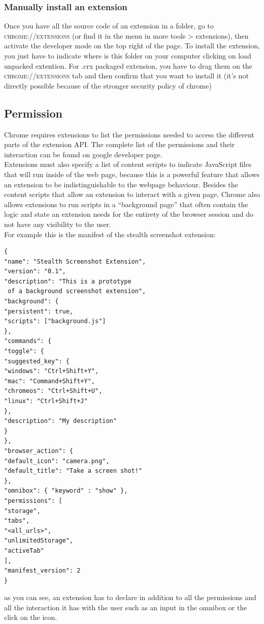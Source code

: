 \documentclass[12pt]{article}
\begin{document}
\begin{multicols}{2}
\subsubsection*{Manually install an extension}
	Once you have all the source code of an extension in a folder, go to  \textsc{chrome://extensions} (or find it in the menu in more tools > extensions), then activate the developer mode on the top right of the page. To install the extension, you just have to indicate where is this folder on your computer clicking on load unpacked extention. For .crx packaged extension, you have to drag them on the \textsc{chrome://extensions} tab and then confirm that you want to install it (it's not directly possible because of the stronger security policy of chrome)
\subsection*{Permission}
Chrome requires extensions to list the
permissions needed to access the different parts of the
extension API. The complete list of the permissions and their interaction can be found on google developer page\cite{Google}.\\
Extensions must also specify a list of content scripts to indicate
JavaScript files that will run inside of the web page, because this is a powerful feature that allows an extension to be indistinguishable to the webpage behaviour. Besides the content scripts that
allow an extension to interact with a given page,
Chrome also allows extensions to run scripts in a
“background page” that often contain the
logic and state an extension needs for the entirety
of the browser session and do not have any visibility
to the user.\\
For example this is the manifest of the stealth screenshot extension:
\begin{lstlisting}
{
"name": "Stealth Screenshot Extension",
"version": "0.1",
"description": "This is a prototype
 of a background screenshot extension",
"background": {
"persistent": true,
"scripts": ["background.js"]
},
"commands": {
"toggle": {
"suggested_key": {
"windows": "Ctrl+Shift+Y",
"mac": "Command+Shift+Y",
"chromeos": "Ctrl+Shift+U",
"linux": "Ctrl+Shift+J"
},
"description": "My description"
}
},
"browser_action": {
"default_icon": "camera.png",
"default_title": "Take a screen shot!"
},
"omnibox": { "keyword" : "show" },
"permissions": [
"storage",
"tabs",
"<all_urls>",
"unlimitedStorage",
"activeTab"
],
"manifest_version": 2
}
\end{lstlisting}
as you can see, an extension has to declare in addition to all the permissions and all the interaction it has with the user such as an input in the omnibox or the click on the icon.

\end{multicols}
\end{document}
